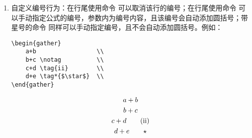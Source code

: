 \begin{enumerate}
\begin{tcolorbox}[sidebyside]
\begin{lstlisting}
\begin{subequations} \begin{gather}
    \sin^2 x=\frac{1-\cos 2x}{2}\\
    \cos^2 x=\frac{1+\cos 2x}{2}
\end{gather} \end{subequations}
\end{lstlisting} 

\tcblower

\begin{subequations} \begin{gather}
    \sin^2 x=\frac{1-\cos 2x}{2}\\
    \cos^2 x=\frac{1+\cos 2x}{2}
    \end{gather} 
\end{subequations}
\end{tcolorbox}

\item 自定义编号行为：在行尾使用命令 \boxforcmd{\\notag} 可以取消该行的编号；在行尾使用命令 \boxforcmd{\\tag{}} 可以手动指定公式的编号，参数内为编号内容，且该编号会自动添加圆括号；带星号的命令 \boxforcmd{\\tag*{}} 同样可以手动指定编号，且不会自动添加圆括号。例如：

\begin{tcolorbox}[sidebyside]
\begin{lstlisting}
\begin{gather}
    a+b                 \\
    b+c \notag          \\
    c+d \tag{ii}        \\
    d+e \tag*{$\star$}  \\
\end{gather}
\end{lstlisting} 

\tcblower

\begin{gather}
    a+b\\
    b+c \notag\\
    c+d \tag{ii}\\
    d+e \tag*{$\star$}
\end{gather}
\end{tcolorbox}


\end{enumerate}


